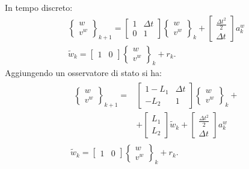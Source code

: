 In tempo discreto:
\begin{equation}
\label{eq:8filtro11}
\begin{array}{l}
\left\{
\begin{array}{c}
w\\
v^w\end{array}\right\}_{k+1} = \left[\begin{array}{cc}1&\Delta t\\0&1\end{array}\right]\left\{
\begin{array}{c}
w\\
v^w\end{array}\right\}_k+
\left[\begin{array}{c}\frac{\Delta t^2}{2}\\\Delta t\end{array}\right]a^w_k\\


\tilde{w}_k = \left[\begin{array}{cc} 1&0\end{array}\right]\left\{
\begin{array}{c}
w\\
v^w\end{array}\right\}_k+ r_k.
\end{array}
\end{equation}
Aggiungendo un osservatore di stato si ha:
\begin{equation}
\label{eq:8filtro12}
\begin{array}{l}
\begin{array}{ll}
\left\{
\begin{array}{c}
w\\
v^w\end{array}\right\}_{k+1} =& \left[\begin{array}{cc}1-L_1&\Delta t\\-L_2&1\end{array}\right]\left\{
\begin{array}{c}
w\\
v^w\end{array}\right\}_k+\\
&+\left[\begin{array}{c}L_1\\L_2\end{array}\right]\tilde{w}_k+
\left[\begin{array}{c}\frac{\Delta t^2}{2}\\\Delta t\end{array}\right]a^w_k
\end{array}\\

\tilde{w}_k = \left[\begin{array}{cc} 1&0\end{array}\right]\left\{
\begin{array}{c}
w\\
v^w\end{array}\right\}_k+ r_k.
\end{array}
\end{equation}

